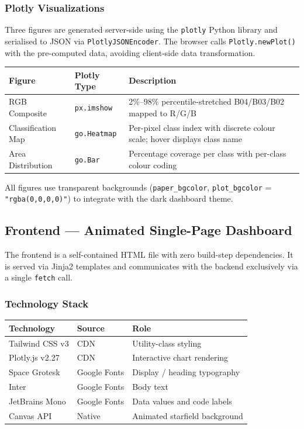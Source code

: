 \documentclass[12pt, a4paper]{article}
\begin{document}
\subsubsection{Plotly Visualizations}

Three figures are generated server-side using the \texttt{plotly} Python library and serialised to JSON via \texttt{PlotlyJSONEncoder}. The browser calls \texttt{Plotly.newPlot()} with the pre-computed data, avoiding client-side data transformation.

\begin{center}
\renewcommand{\arraystretch}{1.2}
\begin{tabular}{llp{7cm}}
\toprule
\textbf{Figure} & \textbf{Plotly Type} & \textbf{Description} \\
\midrule
RGB Composite       & \texttt{px.imshow}   & 2\%--98\% percentile-stretched B04/B03/B02 mapped to R/G/B \\
Classification Map  & \texttt{go.Heatmap}  & Per-pixel class index with discrete colour scale; hover displays class name \\
Area Distribution   & \texttt{go.Bar}      & Percentage coverage per class with per-class colour coding \\
\bottomrule
\end{tabular}
\end{center}

All figures use transparent backgrounds (\texttt{paper\_bgcolor}, \texttt{plot\_bgcolor} = \texttt{"rgba(0,0,0,0)"}) to integrate with the dark dashboard theme.

\subsection{Frontend — Animated Single-Page Dashboard}

The frontend is a self-contained HTML file with zero build-step dependencies. It is served via Jinja2 templates and communicates with the backend exclusively via a single \texttt{fetch} call.

\subsubsection{Technology Stack}

\begin{center}
\renewcommand{\arraystretch}{1.2}
\begin{tabular}{lll}
\toprule
\textbf{Technology} & \textbf{Source} & \textbf{Role} \\
\midrule
Tailwind CSS v3    & CDN & Utility-class styling \\
Plotly.js v2.27    & CDN & Interactive chart rendering \\
Space Grotesk      & Google Fonts & Display / heading typography \\
Inter              & Google Fonts & Body text \\
JetBrains Mono     & Google Fonts & Data values and code labels \\
Canvas API         & Native & Animated starfield background \\
\bottomrule
\end{tabular}
\end{center}
\end{document}
